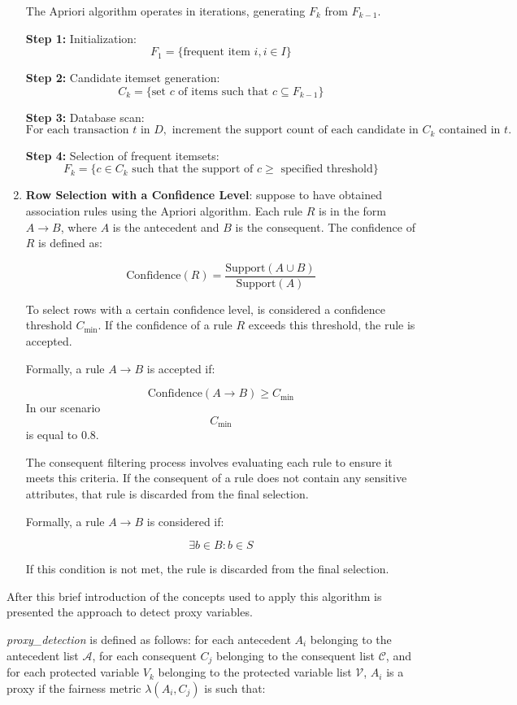 \documentclass[12pt,a4paper,openright,twoside]{book}
\begin{document}
\begin{enumerate}
The Apriori algorithm operates in iterations, generating $F_k$ from $F_{k-1}$.

\textbf{Step 1:} Initialization:
$$F_1 = \{ \text{frequent item } i, i \in I \}$$

\textbf{Step 2:} Candidate itemset generation:
$$C_k = \{ \text{set } c \text{ of items such that } c \subseteq F_{k-1} \}$$

\textbf{Step 3:} Database scan:
$$\text{For each transaction } t \text{ in } D, \text{ increment the support count of each candidate in } C_k \text{ contained in } t.$$

\textbf{Step 4:} Selection of frequent itemsets:
$$F_k = \{ c \in C_k \text{ such that the support of } c \geq \text{ specified threshold} \}$$

\item \textbf{Row Selection with a Confidence Level}: 
suppose to have obtained association rules using the Apriori algorithm. Each rule $R$ is in the form $A \rightarrow B$, where $A$ is the antecedent and $B$ is the consequent. The confidence of $R$ is defined as:

\[
\text{Confidence}(R) = \frac{\text{Support}(A \cup B)}{\text{Support}(A)}
\]

To select rows with a certain confidence level, is considered a confidence threshold $C_{\text{min}}$. If the confidence of a rule $R$ exceeds this threshold, the rule is accepted.

Formally, a rule $A \rightarrow B$ is accepted if:

\[
\text{Confidence}(A \rightarrow B) \geq C_{\text{min}}
\]
In our scenario
\[
C_{\text{min}}
\]
is equal to 0.8. 


The consequent filtering process involves evaluating each rule to ensure it meets this criteria. If the consequent of a rule does not contain any sensitive attributes, that rule is discarded from the final selection. 


Formally, a rule $A \rightarrow B$ is considered if:

\[
\exists b \in B : b \in S
\]

If this condition is not met, the rule is discarded from the final selection.
\end{enumerate}
After this brief introduction of the concepts used to apply this algorithm is presented the approach to detect proxy variables. 

\textit{proxy\_detection} is defined as follows: for each antecedent \( A_i \) belonging to the antecedent list \( \mathcal{A} \), for each consequent \( C_j \) belonging to the consequent list \( \mathcal{C} \), and for each protected variable \( V_k \) belonging to the protected variable list \( \mathcal{V} \), \( A_i \) is a proxy if the fairness metric \( \lambda(A_i, C_j) \) is such that:
\end{document}
